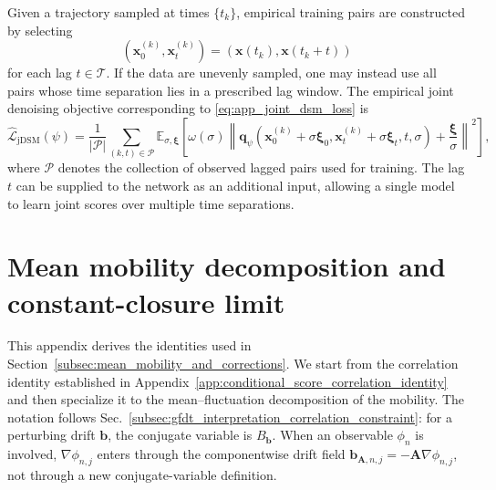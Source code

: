 \documentclass[11pt,twoside,fleqn]{article}
\begin{document}
Given a trajectory sampled at times $\{t_k\}$, empirical training pairs are
constructed by selecting
\begin{equation}
    (\bm{x}_0^{(k)},\bm{x}_t^{(k)})
    =
    (\bm{x}(t_k),\bm{x}(t_k+t))
\end{equation}
for each lag $t\in\mathcal{T}$. If the data are unevenly sampled, one may
instead use all pairs whose time separation lies in a prescribed lag window.
The empirical joint denoising objective corresponding to
\eqref{eq:app_joint_dsm_loss} is
\begin{equation}
    \widehat{\mathcal{L}}_{\mathrm{jDSM}}(\psi)
    =
    \frac{1}{|\mathcal{P}|}
    \sum_{(k,t)\in\mathcal{P}}
    \mathbb{E}_{\sigma,\bm{\xi}}
    \left[
        \omega(\sigma)
        \left\|
            \bm{q}_{\psi}
            \left(
                \bm{x}_0^{(k)}+\sigma\bm{\xi}_0,
                \bm{x}_t^{(k)}+\sigma\bm{\xi}_t,
                t,
                \sigma
            \right)
            +
            \frac{\bm{\xi}}{\sigma}
        \right\|^2
    \right],
    \label{eq:app_empirical_joint_dsm}
\end{equation}
where $\mathcal{P}$ denotes the collection of observed lagged pairs used for
training. The lag $t$ can be supplied to the network as an additional input,
allowing a single model to learn joint scores over multiple time separations.


\section{Mean mobility decomposition and constant-closure limit}
\label{app:mean_mobility_correction_derivation}

This appendix derives the identities used in
Section~\ref{subsec:mean_mobility_and_corrections}. We start from the
correlation identity established in
Appendix~\ref{app:conditional_score_correlation_identity} and then specialize it
to the mean--fluctuation decomposition of the mobility. The notation follows
Sec.~\ref{subsec:gfdt_interpretation_correlation_constraint}: for a perturbing
drift \(\bm{b}\), the conjugate variable is \(B_{\bm{b}}\). When an observable
\(\phi_n\) is involved, \(\nabla\phi_{n,j}\) enters through the componentwise
drift field \(\bm{b}_{\bm{A},n,j}=-\bm{A}\nabla\phi_{n,j}\), not through a new
conjugate-variable definition.
\end{document}
